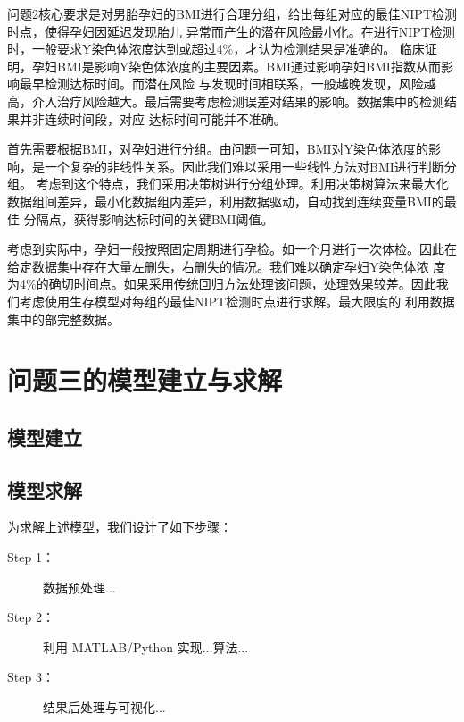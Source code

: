 \documentclass[withoutpreface,notoc]{cumcmthesis}
\begin{document}
	问题2核心要求是对男胎孕妇的BMI进行合理分组，给出每组对应的最佳NIPT检测时点，使得孕妇因延迟发现胎儿
	异常而产生的潜在风险最小化。在进行NIPT检测时，一般要求Y染色体浓度达到或超过4\%，才认为检测结果是准确的。
	临床证明，孕妇BMI是影响Y染色体浓度的主要因素。BMI通过影响孕妇BMI指数从而影响最早检测达标时间。而潜在风险
	与发现时间相联系，一般越晚发现，风险越高，介入治疗风险越大。最后需要考虑检测误差对结果的影响。数据集中的检测结果并非连续时间段，对应
	达标时间可能并不准确。

	首先需要根据BMI，对孕妇进行分组。由问题一可知，BMI对Y染色体浓度的影响，是一个复杂的非线性关系。因此我们难以采用一些线性方法对BMI进行判断分组。
	考虑到这个特点，我们采用决策树进行分组处理。利用决策树算法来最大化数据组间差异，最小化数据组内差异，利用数据驱动，自动找到连续变量BMI的最佳
	分隔点，获得影响达标时间的关键BMI阈值。

	考虑到实际中，孕妇一般按照固定周期进行孕检。如一个月进行一次体检。因此在给定数据集中存在大量左删失，右删失的情况。我们难以确定孕妇Y染色体浓
	度为4\%的确切时间点。如果采用传统回归方法处理该问题，处理效果较差。因此我们考虑使用生存模型对每组的最佳NIPT检测时点进行求解。最大限度的
	利用数据集中的部完整数据。







	\section{问题三的模型建立与求解}

	\subsection{模型建立}
	\subsection{模型求解}
	为求解上述模型，我们设计了如下步骤：
	
	\begin{description}
		\item[Step 1：] 数据预处理...
		\item[Step 2：] 利用 MATLAB/Python 实现...算法...
		\item[Step 3：] 结果后处理与可视化...
	\end{description}
\end{document}
